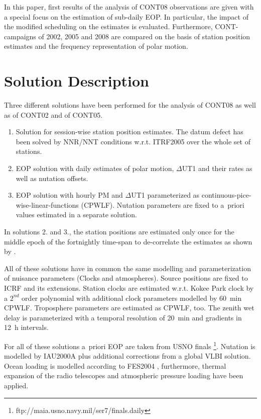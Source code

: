 \documentclass[natbib,twocolumn,twoside]{svmultiag}
\begin{document}
In this paper, first results of the analysis of CONT08 observations are given
with a special focus on the estimation of sub-daily EOP.
In particular, the impact of the modified scheduling on the estimates is
evaluated.
Furthermore, CONT-campaigns of 2002, 2005 and 2008 are compared on the basis
of station position estimates and the frequency representation of polar
motion.


\section{Solution Description}                                 \label{sec:sol}
Three different solutions have been performed for the analysis of CONT08 
as well as of CONT02 and of CONT05.
\begin{enumerate}
\item Solution for session-wise station position estimates. The datum 
      defect has been solved by NNR/NNT conditions w.r.t. ITRF2005
      over the whole set of stations.
\item EOP solution with daily estimates of polar motion, $\Delta$UT1
      and their rates as well as nutation offsets.
\item EOP solution with hourly PM and $\Delta$UT1 parameterized as
      continuous-pice-wise-linear-functions (CPWLF). Nutation
      parameters are fixed to a~priori values estimated in a separate
      solution.
\end{enumerate}
In solutions 2. and 3., the station positions are estimated only once for the
middle epoch of the fortnightly time-span to de-correlate the estimates as
shown by \cite{Artz2007}.

All of these solutions have in common the same modelling and parameterization
of nuisance parameters (Clocks and atmospheres).
Source positions are fixed to ICRF and its extensions.
Station clocks are estimated w.r.t. Kokee Park clock by a $2^{nd}$ order
polynomial with additional clock parameters modelled by 60~min CPWLF. 
Troposphere parameters are estimated as CPWLF, too.
The zenith wet delay is parameterized with a temporal resolution of 20~min 
and gradients in 12~h intervals.

For all of these solutions a~priori EOP are taken from USNO finals 
\footnote{ftp://maia.usno.navy.mil/ser7/finals.daily}.
Nutation is modelled by IAU2000A \citep{iers_conv2004} plus additional 
corrections from a global VLBI solution.
Ocean loading is modelled according to FES2004 \citep{fes2004}, furthermore,
thermal expansion of the radio telescopes \citep{nothnagel2008} and
atmospheric pressure loading \citep{aplo} have been applied.
\end{document}
